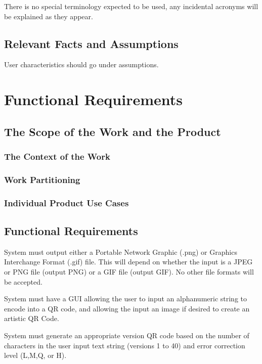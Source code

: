 \documentclass[12pt, titlepage]{article}
\begin{document}
			There is no special terminology expected to be used, any incidental 
			acronyms will be explained as they appear.

\subsection{Relevant Facts and Assumptions}

User characteristics should go under assumptions.

\section{Functional Requirements}

\subsection{The Scope of the Work and the Product}

\subsubsection{The Context of the Work}

\subsubsection{Work Partitioning}

\subsubsection{Individual Product Use Cases}

\subsection{Functional Requirements}

	System must output either a Portable Network Graphic (.png) or Graphics 
	Interchange Format (.gif) file. This will depend on whether the input is a 
	JPEG or PNG file (output PNG) or a GIF file (output GIF). No other file 
	formats will be accepted. 
	
	System must have a GUI allowing the user to input an alphanumeric string to 
	encode into a QR code, and allowing the input an image if desired to create 
	an artistic QR Code.
	
	System must generate an appropriate version QR code based on the number of 
	characters in the user input text string (versions 1 to 40) and error 
	correction level (L,M,Q, or H).
	
\end{document}
